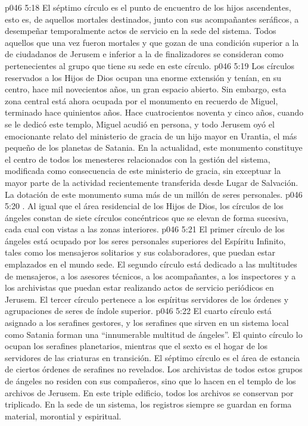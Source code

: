 \vs p046 5:18 El séptimo círculo es el punto de encuentro de los hijos ascendentes, esto es, de aquellos mortales destinados, junto con sus acompañantes seráficos, a desempeñar temporalmente actos de servicio en la sede del sistema. Todos aquellos que una vez fueron mortales y que gozan de una condición superior a la de ciudadanos de Jerusem e inferior a la de finalizadores se consideran como pertenecientes al grupo que tiene su sede en este círculo.
\vs p046 5:19 Los círculos reservados a los Hijos de Dios ocupan una enorme extensión y tenían, en su centro, hace mil novecientos años, un gran espacio abierto. Sin embargo, esta zona central está ahora ocupada por el monumento en recuerdo de Miguel, terminado hace quinientos años. Hace cuatrocientos noventa y cinco años, cuando se le dedicó este templo, Miguel acudió en persona, y todo Jerusem oyó el emocionante relato del ministerio de gracia de un hijo mayor en Urantia, el más pequeño de los planetas de Satania. En la actualidad, este monumento constituye el centro de todos los menesteres relacionados con la gestión del sistema, modificada como consecuencia de este ministerio de gracia, sin exceptuar la mayor parte de la actividad recientemente transferida desde Lugar de Salvación. La dotación de este monumento suma más de un millón de seres personales.
\vs p046 5:20 . Al igual que el área residencial de los Hijos de Dios, los círculos de los ángeles constan de siete círculos concéntricos que se elevan de forma sucesiva, cada cual con vistas a las zonas interiores.
\vs p046 5:21 \pc El primer círculo de los ángeles está ocupado por los seres personales superiores del Espíritu Infinito, tales como los mensajeros solitarios y sus colaboradores, que puedan estar emplazados en el mundo sede. El segundo círculo está dedicado a las multitudes de mensajeros, a los asesores técnicos, a los acompañantes, a los inspectores y a los archivistas que puedan estar realizando actos de servicio periódicos en Jerusem. El tercer círculo pertenece a los espíritus servidores de los órdenes y agrupaciones de seres de índole superior.
\vs p046 5:22 El cuarto círculo está asignado a los serafines gestores, y los serafines que sirven en un sistema local como Satania forman una “innumerable multitud de ángeles”. El quinto círculo lo ocupan los serafines planetarios, mientras que el sexto es el hogar de los servidores de las criaturas en transición. El séptimo círculo es el área de estancia de ciertos órdenes de serafines no revelados. Los archivistas de todos estos grupos de ángeles no residen con sus compañeros, sino que lo hacen en el templo de los archivos de Jerusem. En este triple edificio, todos los archivos se conservan por triplicado. En la sede de un sistema, los registros siempre se guardan en forma material, morontial y espiritual.
